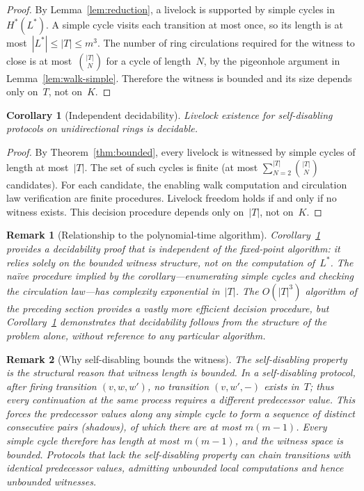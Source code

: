 \documentclass{article}
\newtheorem{corollary}[theorem]{Corollary}
\newtheorem{remark}{Remark}
\newcommand{\Hstar}{H^{*}}
\newcommand{\Lstar}{L^{*}}
\begin{document}
\begin{proof}
By Lemma~\ref{lem:reduction}, a livelock is supported by
simple cycles in~$\Hstar(\Lstar)$.
A simple cycle visits each transition at most once, so its
length is at most~$|\Lstar| \leq |T| \leq m^3$.
The number of ring circulations required for the witness
to close is at most~$\binom{|T|}{N}$ for a cycle of
length~$N$, by the pigeonhole argument in
Lemma~\ref{lem:walk-simple}.
Therefore the witness is bounded and its size depends only
on~$T$, not on~$K$.
\end{proof}

\begin{corollary}[Independent decidability]
\label{cor:decidability}
Livelock existence for self-disabling protocols on
unidirectional rings is decidable.
\end{corollary}

\begin{proof}
By Theorem~\ref{thm:bounded}, every livelock is witnessed
by simple cycles of length at most~$|T|$.
The set of such cycles is finite (at most
$\sum_{N=2}^{|T|} \binom{|T|}{N}$ candidates).
For each candidate, the enabling walk computation and
circulation law verification are finite procedures.
Livelock freedom holds if and only if no witness exists.
This decision procedure depends only on~$|T|$, not on~$K$.
\end{proof}

\begin{remark}[Relationship to the polynomial-time algorithm]
Corollary~\ref{cor:decidability} provides a decidability
proof that is independent of the fixed-point algorithm:
it relies solely on the bounded witness structure, not
on the computation of~$\Lstar$.
The na\"ive procedure implied by the corollary---enumerating
simple cycles and checking the circulation law---has
complexity exponential in~$|T|$.
The $O(|T|^3)$ algorithm of the preceding section provides
a vastly more efficient decision procedure, but
Corollary~\ref{cor:decidability} demonstrates that
decidability follows from the structure of the problem
alone, without reference to any particular algorithm.
\end{remark}

\begin{remark}[Why self-disabling bounds the witness]
\label{rem:why}
The self-disabling property is the structural reason that
witness length is bounded.
In a self-disabling protocol, after firing
transition $(v, w, w')$, no transition $(v, w', {-})$
exists in~$T$; thus every continuation at the same process
requires a \emph{different} predecessor value.
This forces the predecessor values along any simple cycle
to form a sequence of distinct consecutive pairs (shadows),
of which there are at most $m(m{-}1)$.
Every simple cycle therefore has length at most~$m(m{-}1)$,
and the witness space is bounded.
Protocols that lack the self-disabling property can chain
transitions with identical predecessor values, admitting
unbounded local computations and hence unbounded witnesses.
\end{remark}
\end{document}
